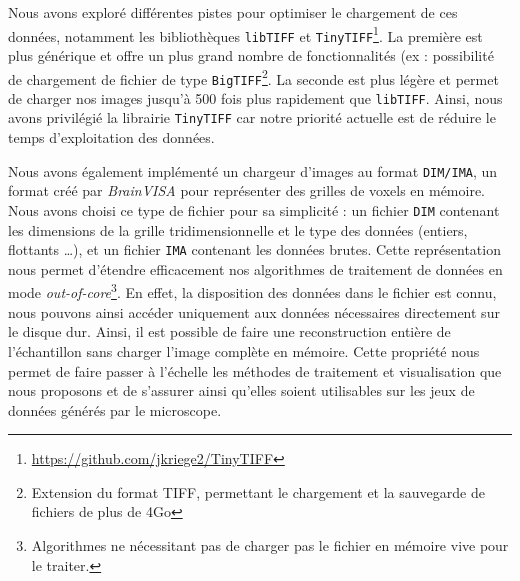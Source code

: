 {{        Nous avons exploré différentes pistes pour optimiser le chargement de ces données, notamment les bibliothèques \texttt{libTIFF} et \texttt{TinyTIFF}\footnote{\url{https://github.com/jkriege2/TinyTIFF}}. La première est plus générique et offre un plus grand nombre de fonctionnalités (ex : possibilité de chargement de fichier de type \texttt{BigTIFF}\footnote{Extension du format TIFF, permettant le chargement et la sauvegarde de fichiers de plus de 4Go}. La seconde est plus légère et permet de charger nos images jusqu'à 500 fois plus rapidement que \texttt{libTIFF}. Ainsi, nous avons privilégié la librairie \texttt{TinyTIFF} car notre priorité actuelle est de réduire le temps d'exploitation des données. 
        

        Nous avons également implémenté un chargeur d'images au format \texttt{DIM/IMA}, un format créé par \textit{BrainVISA} pour représenter des grilles de voxels en mémoire. Nous avons choisi ce type de fichier pour sa simplicité : un fichier \texttt{DIM} contenant les dimensions de la grille tridimensionnelle et le type des données (entiers, flottants \ldots), et un fichier \texttt{IMA} contenant les données brutes. Cette représentation nous permet d'étendre efficacement nos algorithmes de traitement de données en mode  \textit{out-of-core}\footnote{Algorithmes ne nécessitant pas de charger pas le fichier en mémoire vive pour le traiter.}. En effet, la disposition des données dans le fichier est connu, nous pouvons ainsi accéder uniquement aux données nécessaires directement sur le disque dur. Ainsi, il est possible de faire une reconstruction entière de l'échantillon sans charger l'image complète en mémoire. Cette propriété nous permet de faire passer à l'échelle les méthodes de traitement et visualisation que nous proposons et de s'assurer ainsi qu'elles soient utilisables sur les jeux de données générés par le microscope.

}}
